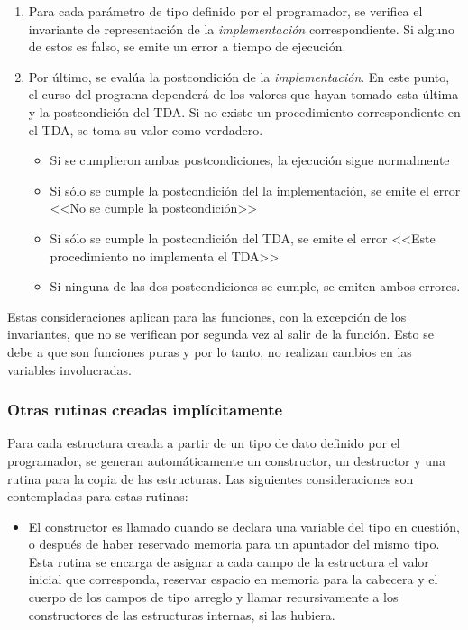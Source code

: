 {{\begin{enumerate}
  \item Para cada parámetro de tipo definido por el programador, se verifica el
  invariante de representación de la \textit{implementación} correspondiente. Si
  alguno de estos es falso, se emite un error a tiempo de ejecución.

  \item Por último, se evalúa la postcondición de la \textit{implementación}. En
  este punto, el curso del programa dependerá de los valores que hayan tomado
  esta última y la postcondición del TDA. Si no existe un procedimiento
  correspondiente en el TDA, se toma su valor como verdadero.
    \begin{itemize}
      \item Si se cumplieron ambas postcondiciones, la ejecución sigue normalmente
      \item Si sólo se cumple la postcondición del la implementación, se emite el
      error <<No se cumple la postcondición>>
      \item Si sólo se cumple la postcondición del TDA, se emite el error <<Este
      procedimiento no implementa el TDA>>
      \item Si ninguna de las dos postcondiciones se cumple, se emiten ambos errores.
    \end{itemize}
\end{enumerate}

Estas consideraciones aplican para las funciones, con la excepción de los
invariantes, que no se verifican por segunda vez al salir de la función. Esto se
debe a que son funciones puras y por lo tanto, no realizan cambios en las
variables involucradas.

\subsubsection{Otras rutinas creadas implícitamente}

Para cada estructura creada a partir de un tipo de dato definido por el programador,
se generan automáticamente un constructor, un destructor y una rutina para la
copia de las estructuras. Las siguientes consideraciones son contempladas para
estas rutinas:

\begin{itemize}

  \item El constructor es llamado cuando se declara una variable del tipo en
  cuestión, o después de haber reservado memoria para un apuntador del mismo
  tipo. Esta rutina se encarga de asignar a cada campo de la estructura el
  valor inicial que corresponda, reservar espacio en memoria para la cabecera
  y el cuerpo de los campos de tipo arreglo y llamar recursivamente a los
  constructores de las estructuras internas, si las hubiera.


\end{itemize}}}
